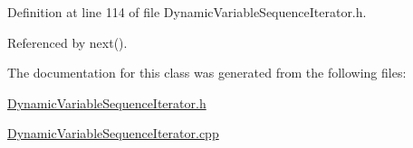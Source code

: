 Definition at line 114 of file Dynamic\-Variable\-Sequence\-Iterator.h.

Referenced by next().

The documentation for this class was generated from the following files:\begin{CompactItemize}
\item 
\hyperlink{DynamicVariableSequenceIterator_8h}{Dynamic\-Variable\-Sequence\-Iterator.h}\item 
\hyperlink{DynamicVariableSequenceIterator_8cpp}{Dynamic\-Variable\-Sequence\-Iterator.cpp}\end{CompactItemize}
